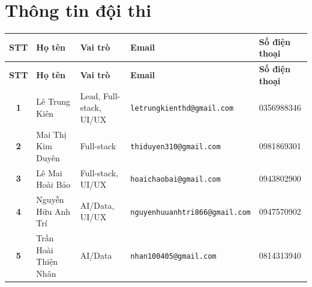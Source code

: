 \section{Thông tin đội thi}

\begingroup
\footnotesize
\setlength{\tabcolsep}{2.5pt}
\renewcommand{\arraystretch}{1.25}

\begin{longtable}{|c|p{}|p{}|p{}|p{}|}
\hline
\textbf{STT} &
\centering\arraybackslash\textbf{Họ tên} &
\centering\arraybackslash\textbf{Vai trò} &
\centering\arraybackslash\textbf{Email} &
\centering\arraybackslash\textbf{Số điện thoại} \\ \hline
\endfirsthead

\hline
\textbf{STT} &
\centering\arraybackslash\textbf{Họ tên} &
\centering\arraybackslash\textbf{Vai trò} &
\centering\arraybackslash\textbf{Email} &
\centering\arraybackslash\textbf{Số điện thoại} \\ \hline
\endhead

\textbf{1} &
Lê Trung Kiên &
Lead, Full-stack, UI/UX &
\nolinkurl{letrungkienthd@gmail.com} &
\mbox{0356988346} \\ \hline

\textbf{2} &
Mai Thị Kim Duyên &
Full-stack &
\nolinkurl{thiduyen310@gmail.com} &
\mbox{0981869301} \\ \hline

\textbf{3} &
Lê Mai Hoài Bảo &
Full-stack, UI/UX &
\nolinkurl{hoaichaobai@gmail.com} &
\mbox{0943802900} \\ \hline

\textbf{4} &
Nguyễn Hữu Anh Trí &
AI/Data, UI/UX &
\nolinkurl{nguyenhuuanhtri866@gmail.com} &
\mbox{0947570902} \\ \hline

\textbf{5} &
Trần Hoài Thiện Nhân &
AI/Data &
\nolinkurl{nhan100405@gmail.com} &
\mbox{0814313940} \\ \hline

\end{longtable}
\endgroup